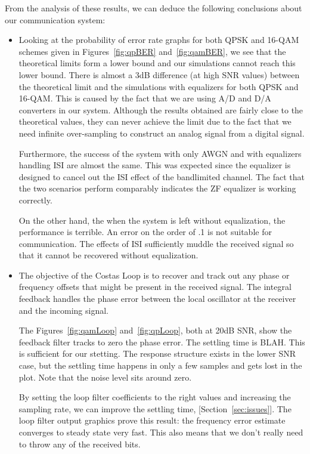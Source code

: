 \documentclass[]{article}
\begin{document}
From the analysis of these results, we can deduce the following conclusions about our communication system:
\begin{itemize}
\item Looking at the probability of error rate graphs for both QPSK and 16-QAM schemes given in Figures~\ref{fig:qpBER} and~\ref{fig:qamBER}, we see that the theoretical limits form a lower bound and our simulations cannot reach this lower bound. There is almost a 3dB difference (at high SNR values) between the theoretical limit and the simulations with equalizers for both QPSK and 16-QAM. This is caused by the fact that we are using A/D and D/A converters in our system. Although the results obtained are fairly close to the theoretical values, they can never achieve the limit due to the fact that we need infinite over-sampling to construct an analog signal from a digital signal. 

Furthermore, the success of the system with only AWGN and with equalizers handling ISI are almost the same. This was expected since the equalizer is designed to cancel out the ISI effect of the bandlimited channel.  The fact that the two scenarios perform comparably indicates the ZF equalizer is working correctly.  

On the other hand, the when the system is left without equalization, the performance is terrible.  An error on the order of .1 is not suitable for communication.  The effects of ISI sufficiently muddle the received signal so that it cannot be recovered without equalization. 

\item The objective of the Costas Loop is to recover and track out any phase or frequency offsets that might be present in the received signal.  The integral feedback handles the phase error between the local oscillator at the receiver and the incoming signal.  

The Figures~\ref{fig:qamLoop} and~\ref{fig:qpLoop}, both at 20dB SNR, show the feedback filter tracks to zero the phase error.  The settling time is BLAH.  This is sufficient for our stetting.  The response structure exists in the lower SNR case, but the settling time happens in only a few samples and gets lost in the plot.  Note that the noise level sits around zero. 

By setting the loop filter coefficients to the right values and increasing the sampling rate, we can improve the settling time, [Section~\ref{sec:issues}]. The loop filter output graphics prove this result: the frequency error estimate converges to steady state very fast. This also means that we don't really need to throw any of the received bits.


\end{itemize}
\end{document}
